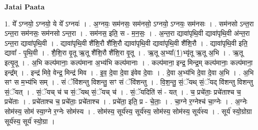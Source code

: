 \documentclass[17pt]{extarticle}
\begin{document}
\textbf{Jatai Paata} \newline

1. ये᳚ ऽग्नयो॒ ऽग्नयो॒ ये ये᳚ ऽग्नयः॑ । . अ॒ग्नयः॒ सम॑नसः॒ सम॑नसो॒ ऽग्नयो॒ ऽग्नयः॒ सम॑नसः । . सम॑नसो ऽन्त॒रा ऽन्त॒रा सम॑नसः॒ सम॑नसो ऽन्त॒रा । . सम॑नस॒ इति॒ स - म॒न॒सः॒ । . अ॒न्त॒रा द्यावा॑पृथि॒वी द्यावा॑पृथि॒वी अ॑न्त॒रा ऽन्त॒रा द्यावा॑पृथि॒वी । . द्यावा॑पृथि॒वी शै॑शि॒रौ शै॑शि॒रौ द्यावा॑पृथि॒वी द्यावा॑पृथि॒वी शै॑शि॒रौ । . द्यावा॑पृथि॒वी इति॒ द्यावा᳚ - पृ॒थि॒वी । . शै॒शि॒रा वृ॒तू ऋ॒तू शै॑शि॒रौ शै॑शि॒रा वृ॒तू । . ऋ॒तू अ॒भ्या᳚(1॒)भ्यृ॑तू ऋ॒तू अ॒भि । . ऋ॒तू इत्यृ॒तू । . अ॒भि कल्प॑मानाः॒ कल्प॑माना अ॒भ्य॑भि कल्प॑मानाः । . कल्प॑माना॒ इन्द्र॒ मिन्द्र॒म् कल्प॑मानाः॒ कल्प॑माना॒ इन्द्र᳚म् । . इन्द्र॑ मिवे॒ वेन्द्र॒ मिन्द्र॑ मिव । . इ॒व॒ दे॒वा दे॒वा इ॑वेव दे॒वाः । . दे॒वा अ॒भ्य॑भि दे॒वा दे॒वा अ॒भि । . अ॒भि सꣳ स म॒भ्य॑भि सम् । . सं ॅवि॑शन्तु विशन्तु॒ सꣳ सं ॅवि॑शन्तु । . वि॒श॒न्तु॒ सं॒ॅयथ् सं॒ॅयद् वि॑शन्तु विशन्तु सं॒ॅयत् । . सं॒ॅयच् च॑ च सं॒ॅयथ् सं॒ॅयच् च॑ । . सं॒ॅयदिति॑ सं - यत् । . च॒ प्रचे॑ताः॒ प्रचे॑ताश्च च॒ प्रचे॑ताः । . प्रचे॑ताश्च च॒ प्रचे॑ताः॒ प्रचे॑ताश्च । . प्रचे॑ता॒ इति॒ प्र - चे॒ताः॒ । . चा॒ग्ने र॒ग्नेश्च॑ चा॒ग्नेः । . अ॒ग्नेः सोम॑स्य॒ सोम॑ स्या॒ग्ने र॒ग्नेः सोम॑स्य । . सोम॑स्य॒ सूर्य॑स्य॒ सूर्य॑स्य॒ सोम॑स्य॒ सोम॑स्य॒ सूर्य॑स्य । . सूर्य॑ स्यो॒ग्रोग्रा सूर्य॑स्य॒ सूर्य॑ स्यो॒ग्रा । \newline
\end{document}
